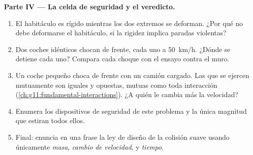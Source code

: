 \begin{problem}
\medskip
\noindent\textbf{Parte IV --- La celda de seguridad y el veredicto.}
\begin{enumerate}[resume]
  \item El habitáculo es rígido mientras los dos extremos se deforman.
        ¿Por qué no debe deformarse el habitáculo, si la rigidez implica
        paradas violentas?
  \item Dos coches idénticos chocan de frente, cada uno a
        \qty{50}{km/h}. ¿Dónde se detiene cada uno? Compara cada choque
        con el ensayo contra el muro.
  \item Un coche pequeño choca de frente con un camión cargado. Las
         que se ejercen mutuamente son iguales y opuestas, mutuas
        como toda interacción
        (\cref{ch:g11:fundamental-interactions}). ¿A quién le cambia más
        la velocidad?
  \item Enumera los dispositivos de seguridad de este problema y la
        única magnitud que estiran todos ellos.
  \item Final: enuncia en una frase la ley de diseño de la colisión
        suave usando únicamente \emph{masa}, \emph{cambio de velocidad},
        \emph{} y \emph{tiempo}.
\end{enumerate}
\end{problem}
